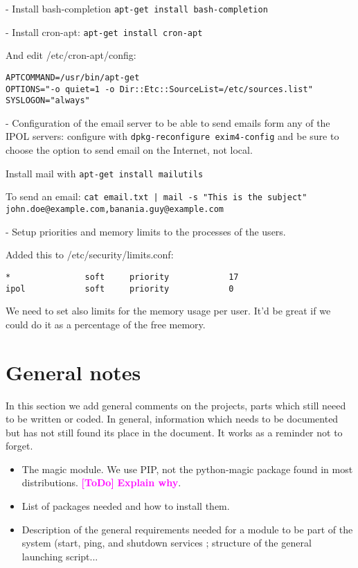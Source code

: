 \documentclass[a4paper,12pt]{article}
\newcommand{\ToDo}[1]{\textcolor{magenta}{\textbf{[ToDo]} \textbf{#1}}}
\begin{document}
- Install bash-completion {\tt apt-get install bash-completion}

- Install cron-apt: {\tt apt-get install cron-apt}

And edit /etc/cron-apt/config:
\begin{verbatim}
APTCOMMAND=/usr/bin/apt-get
OPTIONS="-o quiet=1 -o Dir::Etc::SourceList=/etc/sources.list"
SYSLOGON="always"
\end{verbatim}

- Configuration of the email server to be able to send emails form any of the IPOL servers: configure with {\tt dpkg-reconfigure exim4-config} and be sure to choose the option to send email on the Internet, not local.

Install mail with {\tt apt-get install mailutils}

To send an email: {\tt cat email.txt | mail -s "This is the subject" john.doe@example.com,banania.guy@example.com}


- Setup priorities and memory limits to the processes of the users.

Added this to /etc/security/limits.conf:
\begin{verbatim}
*               soft     priority            17
ipol            soft     priority            0
\end{verbatim}

We need to set also limits for the memory usage per user. It'd be great if we could do it as a percentage of the free memory.


%
%
%



\section{General notes}
In this section we add general comments on the projects, parts which still neeed to be written or coded. In general, information which needs to be documented but has not still found its place in the document. It works as a reminder not to forget.

\begin{itemize}
  \item The magic module. We use PIP, not the python-magic package found in most distributions. \ToDo{Explain why}.
  \item List of packages needed and how to install them.
  \item Description of the general requirements needed for a module to be part of the system (start, ping, and shutdown services ; structure of the general launching script...
\end{itemize}
\end{document}
